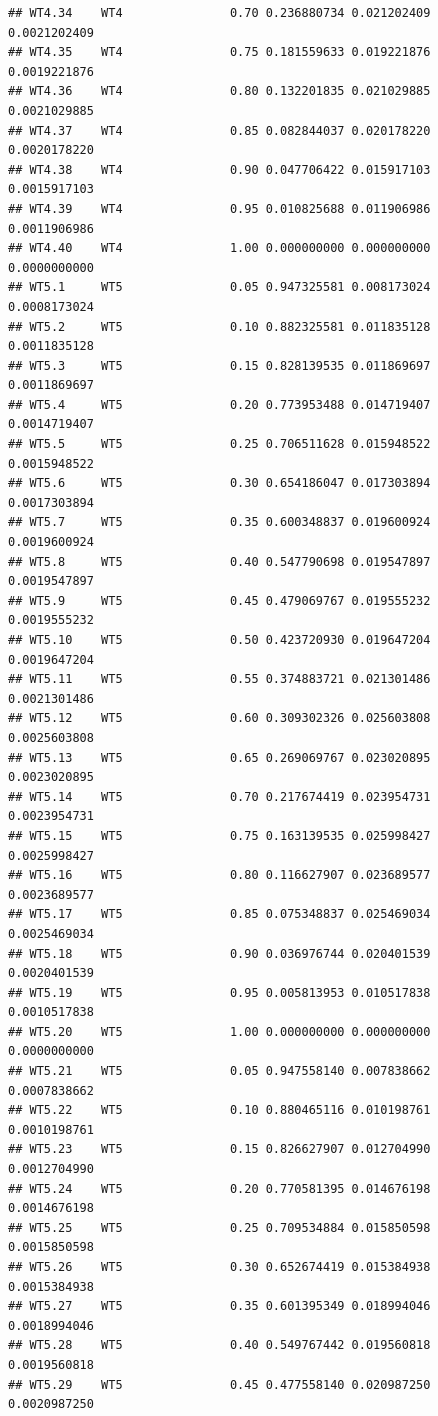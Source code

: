 \documentclass[
]{book}
\begin{document}
\begin{verbatim}
## WT4.34    WT4               0.70 0.236880734 0.021202409 0.0021202409
## WT4.35    WT4               0.75 0.181559633 0.019221876 0.0019221876
## WT4.36    WT4               0.80 0.132201835 0.021029885 0.0021029885
## WT4.37    WT4               0.85 0.082844037 0.020178220 0.0020178220
## WT4.38    WT4               0.90 0.047706422 0.015917103 0.0015917103
## WT4.39    WT4               0.95 0.010825688 0.011906986 0.0011906986
## WT4.40    WT4               1.00 0.000000000 0.000000000 0.0000000000
## WT5.1     WT5               0.05 0.947325581 0.008173024 0.0008173024
## WT5.2     WT5               0.10 0.882325581 0.011835128 0.0011835128
## WT5.3     WT5               0.15 0.828139535 0.011869697 0.0011869697
## WT5.4     WT5               0.20 0.773953488 0.014719407 0.0014719407
## WT5.5     WT5               0.25 0.706511628 0.015948522 0.0015948522
## WT5.6     WT5               0.30 0.654186047 0.017303894 0.0017303894
## WT5.7     WT5               0.35 0.600348837 0.019600924 0.0019600924
## WT5.8     WT5               0.40 0.547790698 0.019547897 0.0019547897
## WT5.9     WT5               0.45 0.479069767 0.019555232 0.0019555232
## WT5.10    WT5               0.50 0.423720930 0.019647204 0.0019647204
## WT5.11    WT5               0.55 0.374883721 0.021301486 0.0021301486
## WT5.12    WT5               0.60 0.309302326 0.025603808 0.0025603808
## WT5.13    WT5               0.65 0.269069767 0.023020895 0.0023020895
## WT5.14    WT5               0.70 0.217674419 0.023954731 0.0023954731
## WT5.15    WT5               0.75 0.163139535 0.025998427 0.0025998427
## WT5.16    WT5               0.80 0.116627907 0.023689577 0.0023689577
## WT5.17    WT5               0.85 0.075348837 0.025469034 0.0025469034
## WT5.18    WT5               0.90 0.036976744 0.020401539 0.0020401539
## WT5.19    WT5               0.95 0.005813953 0.010517838 0.0010517838
## WT5.20    WT5               1.00 0.000000000 0.000000000 0.0000000000
## WT5.21    WT5               0.05 0.947558140 0.007838662 0.0007838662
## WT5.22    WT5               0.10 0.880465116 0.010198761 0.0010198761
## WT5.23    WT5               0.15 0.826627907 0.012704990 0.0012704990
## WT5.24    WT5               0.20 0.770581395 0.014676198 0.0014676198
## WT5.25    WT5               0.25 0.709534884 0.015850598 0.0015850598
## WT5.26    WT5               0.30 0.652674419 0.015384938 0.0015384938
## WT5.27    WT5               0.35 0.601395349 0.018994046 0.0018994046
## WT5.28    WT5               0.40 0.549767442 0.019560818 0.0019560818
## WT5.29    WT5               0.45 0.477558140 0.020987250 0.0020987250

\end{verbatim}
\end{document}
